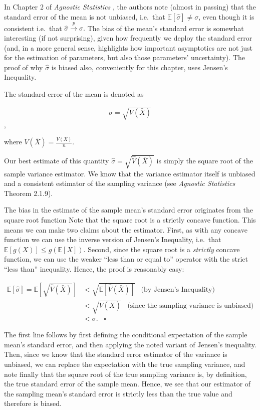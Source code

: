 \documentclass[
]{book}
\begin{document}
In Chapter 2 of \emph{Agnostic Statistics} \citeyearpar{aronow2019foundations}, the authors note (almost in passing) that the standard error of the mean is not unbiased, i.e.~that \(\mathbb{E}[\hat{\sigma}] \neq \sigma\), even though it is consistent i.e.~that \(\hat{\sigma}\xrightarrow{p} \sigma.\) The bias of the mean's standard error is somewhat interesting (if not surprising), given how frequently we deploy the standard error (and, in a more general sense, highlights how important asymptotics are not just for the estimation of parameters, but also those parameters' uncertainty). The proof of why \(\hat{\sigma}\) is biased also, conveniently for this chapter, uses Jensen's Inequality.

The standard error of the mean is denoted as

\[\sigma =  \sqrt{V(\bar{X})}\],

where \(V(\bar{X}) = \frac{V(X)}{n}\).

Our best estimate of this quantity \(\hat{\sigma} = \sqrt{\hat{V}(\bar{X})}\) is simply the square root of the sample variance estimator. We know that the variance estimator itself is unbiased and a consistent estimator of the sampling variance (see \emph{Agnostic Statistics} Theorem 2.1.9).

The bias in the estimate of the sample mean's standard error originates from the square root function Note that the square root is a strictly concave function. This means we can make two claims about the estimator. First, as with any concave function we can use the inverse version of Jensen's Inequality, i.e.~that \(\mathbb{E}[g(X)] \leq g(\mathbb{E}[X])\). Second, since the square root is a \emph{strictly} concave function, we can use the weaker ``less than or equal to'' operator with the strict ``less than'' inequality. Hence, the proof is reasonably easy:

\[
\begin{aligned}
\mathbb{E}\left[\hat{\sigma}\right] = \mathbb{E}\left[\sqrt{\hat{V}(\bar{X})}\right] &< \sqrt{\mathbb{E}[\hat{V}(\bar{X})]} \;\;\; \text{(by Jensen's Inequality)}\\
& < \sqrt{V(\bar{X})} \;\;\; \text{(since the sampling variance is unbiased)} \\
& < \sigma. \;\;\; \square
\end{aligned}
\]

The first line follows by first defining the conditional expectation of the sample mean's standard error, and then applying the noted variant of Jensen's inequality. Then, since we know that the standard error estimator of the variance is unbiased, we can replace the expectation with the true sampling variance, and note finally that the square root of the true sampling variance is, by definition, the true standard error of the sample mean. Hence, we see that our estimator of the sampling mean's standard error is strictly less than the true value and therefore is biased.
\end{document}

